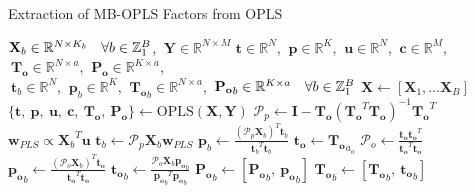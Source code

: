 \begin{algorithm}[H]
\caption{Extraction of MB-OPLS Factors from OPLS}
\label{algorithm.3.7}
\begin{algorithmic}[1]
\REQUIRE $\mathbf{X}_b \in \mathbb{R}^{N \times K_b}
          \quad \forall b \in \mathbb{Z}_{1}^{B}$,%
       $\:\mathbf{Y} \in \mathbb{R}^{N \times M}$
\ENSURE $\mathbf{t} \in \mathbb{R}^N$,%
      $\:\mathbf{p} \in \mathbb{R}^K$,%
      $\:\mathbf{u} \in \mathbb{R}^N$,%
      $\:\mathbf{c} \in \mathbb{R}^M$,%
      $\:\mathbf{T_o} \in \mathbb{R}^{N \times a}$,%
      $\:\mathbf{P_o} \in \mathbb{R}^{K \times a}$, \\
      $\:\mathbf{t}_b \in \mathbb{R}^N$,%
      $\:\mathbf{p}_b \in \mathbb{R}^K$,%
      $\:\mathbf{T_o}_b \in \mathbb{R}^{N \times a}$,%
      $\:\mathbf{P_o}_b \in \mathbb{R}^{K \times a}
       \quad \forall b \in \mathbb{Z}_{1}^{B}$
\STATE $\mathbf{X} \gets [\mathbf{X}_1, \dots \mathbf{X}_B]$
\STATE $\{\mathbf{t}, \: \mathbf{p}, \: \mathbf{u}, \: \mathbf{c}, \:
        \mathbf{T_o}, \: \mathbf{P_o}\} \gets
        \mathrm{OPLS}(\mathbf{X}, \mathbf{Y})$
\STATE $\mathcal{P}_p \gets
        \mathbf{I} - \mathbf{T_o} \left(
         \mathbf{T_o}^T \mathbf{T_o}
        \right)^{-1} \mathbf{T_o}^T$
  \STATE $\mathbf{w}_{PLS} \propto {\mathbf{X}_b}^T \mathbf{u}$
  \STATE $\mathbf{t}_b \gets
          \mathcal{P}_p \mathbf{X}_b \mathbf{w}_{PLS}$
  \STATE $\mathbf{p}_b \gets
          \tfrac{(\mathcal{P}_p \mathbf{X}_b)^T \mathbf{t}_b}
                {{\mathbf{t}_b}^T \mathbf{t}_b}$
    \STATE $\mathbf{t_o} \gets \mathbf{T_o}_{a_o}$ 
    \STATE $\mathcal{P}_o \gets \tfrac{\mathbf{t_o} \mathbf{t_o}^T}
                                      {\mathbf{t_o}^T \mathbf{t_o}}$
    \STATE $\mathbf{p_o}_b \gets
            \tfrac{(\mathcal{P}_o \mathbf{X}_b)^T \mathbf{t_o}}
                  {\mathbf{t_o}^T \mathbf{t_o}}$
    \STATE $\mathbf{t_o}_b \gets
            \tfrac{\mathcal{P}_o \mathbf{X}_b \mathbf{p_o}_b}
                  {{\mathbf{p_o}_b}^T \mathbf{p_o}_b}$
    \STATE $\mathbf{P_o}_b \gets [\mathbf{P_o}_b, \: \mathbf{p_o}_b]$
    \STATE $\mathbf{T_o}_b \gets [\mathbf{T_o}_b, \: \mathbf{t_o}_b]$
  \ENDFOR
\ENDFOR
\end{algorithmic}
\end{algorithm}

